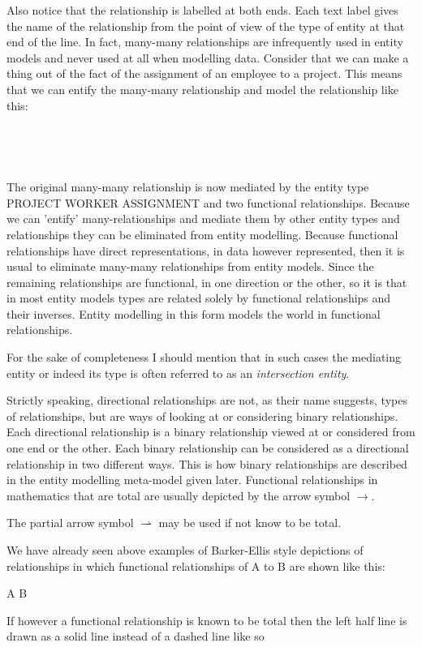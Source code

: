 \noindent Also notice that the relationship is labelled at both ends. Each text label gives the name of the relationship from the point of view of the type of entity at that end of the line.
\noindent In fact, many-many relationships are infrequently used in entity models and never used at all when modelling data.
Consider that we can make a thing out of the fact of the assignment of an employee to a project. This means that we can entify the many-many relationship and model the relationship like this:

\begin{gather}
\label{projectWorkerOurStyleMediated}
\raisebox{-1cm}{

}
\end{gather}

The original many-many relationship is now mediated by the entity type PROJECT WORKER ASSIGNMENT and two functional relationships. Because we can 'entify' many-relationships and mediate them by other entity types and relationships they can be eliminated from entity modelling. Because functional relationships have direct representations, in data however represented, then it is usual to eliminate many-many relationships from entity models. Since the remaining relationships are functional, in one direction or the other, so it is that in most entity models types are related solely by functional relationships and their inverses. Entity modelling in this form models the world in functional relationships.

\mynote For the sake of completeness I should mention that in such cases the mediating entity or indeed its type is often referred to as an \textit{intersection entity}. 

\mynote Strictly speaking, directional relationships are not, as their name suggests, types of relationships, but are ways of looking at or considering binary relationships. Each directional relationship is a binary relationship viewed at or considered from one end or the other. Each binary relationship can be considered as a directional relationship in two different ways.
This is how binary relationships are described in the entity modelling meta-model given later.
\mynote Functional relationships in mathematics that are total are usually depicted by the arrow symbol $\longrightarrow$.

The partial arrow symbol $\rightharpoonup$ may be used if not know to be total. 

\mynote We have already seen above examples of Barker-Ellis style depictions of relationships in which functional relationships of A to B
are shown like this:
\begin{center}
A\,\barkerEllisA\,B
\end{center}
If however a functional relationship is known to be total then the left half line is drawn as a solid line instead of a dashed line like so

